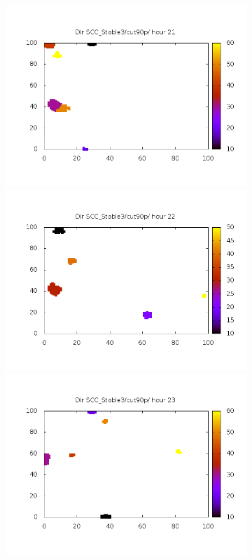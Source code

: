 \documentclass[10pt,a4paper]{article}
\begin{document}
\begin{figure}
\begin{subfigure}[b]{1\textwidth}
\end{subfigure}
\begin{subfigure}[b]{1\textwidth}
\includegraphics[scale=.20]{./img/SCC_Stable3/cut90p/21.png}
\includegraphics[scale=.20]{./img/SCC_Stable3/cut90p/22.png}
\includegraphics[scale=.20]{./img/SCC_Stable3/cut90p/23.png}

\end{subfigure}
\end{figure}
\end{document}
